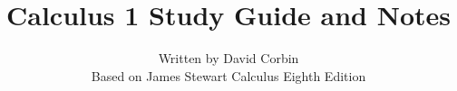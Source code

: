 \documentclass{article}
\begin{document}
\title{Calculus 1 Study Guide and Notes}
\date{}
\author{Written by David Corbin\\ \small{Based on James Stewart Calculus Eighth Edition}}
\maketitle
































\end{document}
